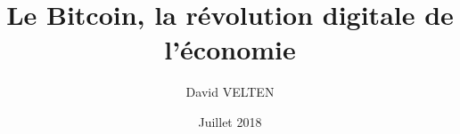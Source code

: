 \documentclass[12pt]{report}
\begin{document}
\title{Le Bitcoin, la révolution digitale de l'économie}
\author{David VELTEN}
\date{Juillet 2018}

\maketitle

\end{document}
